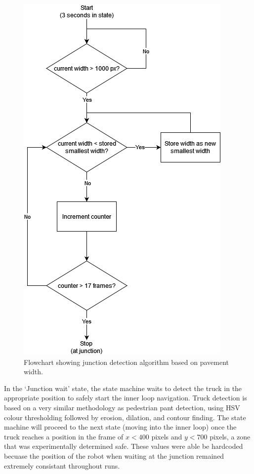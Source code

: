 \documentclass[titlepage]{article}
\begin{document}
            \begin{figure}
                \includegraphics[width=\linewidth]{junctiondiagram.png}
                \caption{Flowchart showing junction detection algorithm based on pavement width.}
                \label{fig:junctionalg}
            \end{figure}

            In the `Junction wait' state, the state machine waits to detect the truck in the appropriate position to safely start the inner loop navigation. Truck detection is based on a very similar methodology as pedestrian pant detection, using HSV colour thresholding followed by erosion, dilation, and contour finding. The state machine will proceed to the next state (moving into the inner loop) once the truck reaches a position in the frame of $x < 400$ pixels and $y<700 $ pixels, a zone that was experimentally determined safe. These values were able be hardcoded becuase the position of the robot when waiting at the junction remained extremely consistant throughout runs. 
\end{document}
